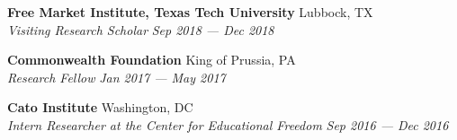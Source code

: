 \documentclass[a4paper,11pt]{article}
\begin{document}
\textbf{Free Market Institute, Texas Tech University} \hfill Lubbock, TX\\
\textit{Visiting Research Scholar} \hfill  \textit{Sep 2018 --- Dec 2018}\\
\vspace{0.5mm}

\textbf{Commonwealth Foundation} \hfill King of Prussia, PA\\
\textit{Research Fellow} \hfill  \textit{Jan 2017 --- May 2017}\\
\vspace{0.5mm}

\textbf{Cato Institute} \hfill Washington, DC\\
\textit{Intern Researcher at the Center for Educational Freedom} \hfill \textit{Sep 2016 --- Dec 2016}\\
\vspace{0.5mm}

\end{document}
